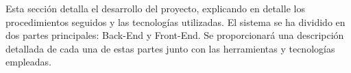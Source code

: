 Esta sección detalla el desarrollo del proyecto, explicando en detalle los procedimientos seguidos y las tecnologías utilizadas. El sistema se ha dividido en dos partes principales: Back-End y Front-End. Se proporcionará una descripción detallada de cada una de estas partes junto con las herramientas y tecnologías empleadas.
